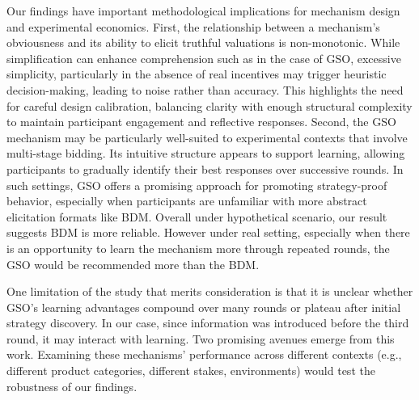 \documentclass[12pt]{article}
\begin{document}
Our findings have important methodological implications for mechanism design and experimental economics. First, the relationship between a mechanism’s obviousness and its ability to elicit truthful valuations is non-monotonic. While simplification can enhance comprehension such as in the case of GSO, excessive simplicity, particularly in the absence of real incentives may trigger heuristic decision-making, leading to noise rather than accuracy. This highlights the need for careful design calibration, balancing clarity with enough structural complexity to maintain participant engagement and reflective responses. Second, the GSO mechanism may be particularly well-suited to experimental contexts that involve multi-stage bidding. Its intuitive structure appears to support learning, allowing participants to gradually identify their best responses over successive rounds. In such settings, GSO offers a promising approach for promoting strategy-proof behavior, especially when participants are unfamiliar with more abstract elicitation formats like BDM. Overall under hypothetical scenario, our result suggests BDM is more reliable. However under real setting, especially when there is an opportunity to learn the mechanism more through repeated rounds, the GSO would be recommended more than the BDM. 

One limitation of the study that merits consideration is that it is unclear whether GSO's learning advantages compound over many rounds or plateau after initial strategy discovery. In our case, since information was introduced before the third round, it may interact with learning.
Two promising avenues emerge from this work. Examining these mechanisms' performance across different contexts (e.g., different product categories, different stakes, environments) would test the robustness of our findings. 





\newpage
	\singlespacing
	\appendix
	\setcounter{table}{0}
	\setcounter{figure}{0}
	\renewcommand{\thetable}{A\arabic{table}}
	\renewcommand{\thefigure}{A\arabic{figure}}
	\setcounter{page}{1}
	\renewcommand{\thesubsection}{\Alph{subsection}}
\end{document}
